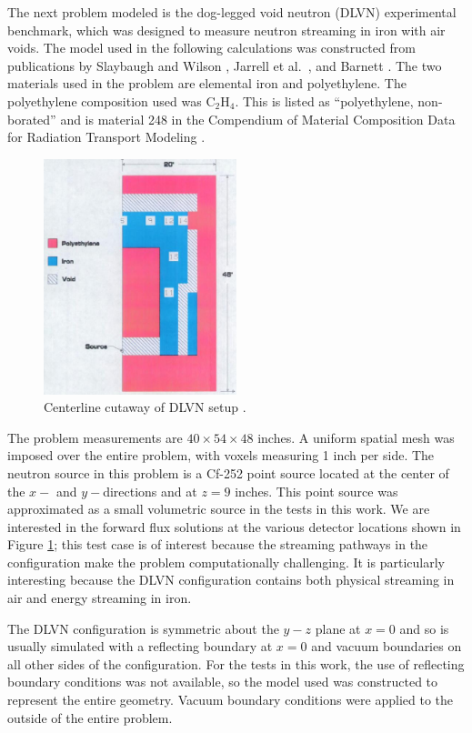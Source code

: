 \documentclass{article} %
\begin{document}
The next problem modeled is the dog-legged void neutron (DLVN) experimental
benchmark, which was designed to measure neutron streaming in iron with air
voids. The model used in the following calculations was constructed from
publications by Slaybaugh and Wilson \cite{sw-dlvn}, Jarrell et al.\
\cite{j-dlvn}, and Barnett \cite{dlvn1991}. The two materials used in the
problem are elemental iron and polyethylene. The polyethylene composition used
was C$_2$H$_4$. This is listed as ``polyethylene, non-borated'' and is
material 248 in the Compendium of Material Composition Data for Radiation
Transport Modeling \cite{pnnl}.

\begin{figure}[!htb]
\centering
\includegraphics[width=0.5\textwidth]{dlvn.png}
\caption{Centerline cutaway of DLVN setup \cite{sw-dlvn}.}
\label{dlvn}
\end{figure}

The problem measurements are $40\times54\times48$ inches. A uniform spatial
mesh was imposed over the entire problem, with voxels measuring 1 inch per
side. The neutron source in this problem is a Cf-252 point source located at
the center of the $x-$ and $y-$directions and at $z = 9$ inches. This point
source was approximated as a small volumetric source in the tests in this
work. We are interested in the forward flux solutions at the various detector
locations shown in Figure \ref{dlvn}; this test case is of interest
because the streaming pathways in the configuration make the problem
computationally challenging. It is particularly interesting because the DLVN
configuration contains both physical streaming in air and energy streaming in
iron. 

The DLVN configuration is symmetric about the $y-z$ plane at $x = 0$
and so is usually simulated with a reflecting boundary at $x = 0$ and vacuum
boundaries on all other sides of the configuration. For the tests in this work,
the use of reflecting boundary conditions was not available, so the model used 
was constructed to represent the entire geometry.
Vacuum boundary conditions were applied to the outside of the entire problem.
\end{document}

